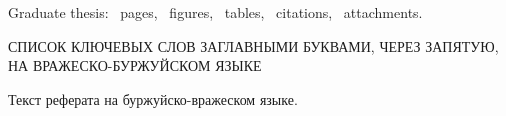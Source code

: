 Graduate thesis: \ pages, \totalfigures{}~figures, \totaltables{}\ tables,
\ citations, \ attachments.

\vspace{\baselineskip}

СПИСОК КЛЮЧЕВЫХ СЛОВ ЗАГЛАВНЫМИ БУКВАМИ, ЧЕРЕЗ ЗАПЯТУЮ, НА ВРАЖЕСКО-БУРЖУЙСКОМ ЯЗЫКЕ

\vspace{\baselineskip}

Текст реферата на буржуйско-вражеском языке.
